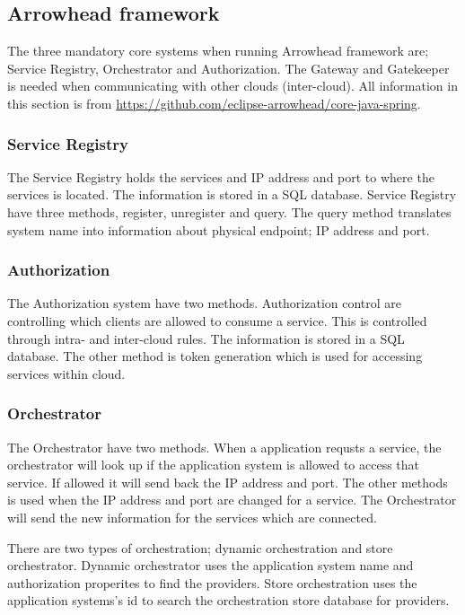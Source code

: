 \subsection{Arrowhead framework}
The three mandatory core systems when running Arrowhead framework are; Service Registry, Orchestrator and Authorization. 
The Gateway and Gatekeeper is needed when communicating with other clouds (inter-cloud). 
All information in this section is from \url{https://github.com/eclipse-arrowhead/core-java-spring}.

\subsubsection{Service Registry}

The Service Registry holds the services and IP address and port to where the services is located. The information is stored in a SQL database. 
Service Registry have three methods, register, unregister and query. The query method translates system name into information about physical endpoint; IP address and port. 

\subsubsection{Authorization}
The Authorization system have two methods. 
Authorization control are controlling which clients are allowed to consume a service. This is controlled through intra- and inter-cloud rules. The information is stored in a SQL database. 
The other method is token generation which is used for accessing services within cloud. 

\subsubsection{Orchestrator}
The Orchestrator have two methods.
When a application requsts a service, the orchestrator will look up if the application system is allowed to access that service. 
If allowed it will send back the IP address and port. 
The other methods is used when the IP address and port are changed for a service. 
The Orchestrator will send the new information for the services which are connected. 

There are two types of orchestration; dynamic orchestration and store orchestrator. 
Dynamic orchestrator uses the application system name and authorization properites to find the providers. 
Store orchestration uses the application systems's id to search the orchestration store database for providers. 

